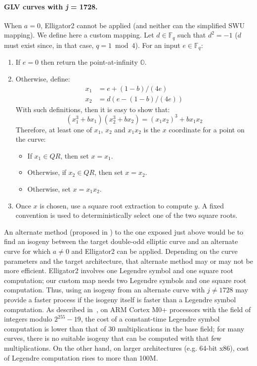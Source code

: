 \documentclass{llncs}
\newcommand{\bF}{\mathbb{F}}
\newcommand{\neutral}{\mathbb{O}}
\begin{document}
\paragraph{GLV curves with \emph{j} = 1728.} When $a = 0$, Elligator2
cannot be applied (and neither can the simplified SWU mapping). We
define here a custom mapping. Let $d \in \bF_q$ such that $d^2 = -1$
($d$ must exist since, in that case, $q = 1\bmod 4$). For an input
$e \in \bF_q$:
\begin{enumerate}

    \item If $e = 0$ then return the point-at-infinity $\neutral$.

    \item Otherwise, define:
    \begin{align*}
        x_1 &= e + (1 - b)/(4e) \\
        x_2 &= d(e - (1 - b)/(4e))
    \end{align*}
    With such definitions, then it is easy to show that:
    \begin{equation*}
        (x_1^3 + bx_1)(x_2^3 + bx_2) = (x_1 x_2)^3 + b x_1 x_2
    \end{equation*}
    Therefore, at least one of $x_1$, $x_2$ and $x_1 x_2$ is the $x$
    coordinate for a point on the curve:
    \begin{itemize}
        \item If $x_1 \in QR$, then set $x = x_1$.
        \item Otherwise, if $x_2 \in QR$, then set $x = x_2$.
        \item Otherwise, set $x = x_1 x_2$.
    \end{itemize}

    \item Once $x$ is chosen, use a square root extraction to compute $y$.
    A fixed convention is used to deterministically select one of the
    two square roots.

\end{enumerate}

An alternate method (proposed in \cite{WahBon2019}) to the one exposed
just above would be to find an isogeny between the target double-odd
elliptic curve and an alternate curve for which $a \neq 0$ and
Elligator2 can be applied. Depending on the curve parameters and the
target architecture, that alternate method may or may not be more
efficient. Elligator2 involves one Legendre symbol and one square root
computation; our custom map needs two Legendre symbols and one square
root computation. Thus, using an isogeny from an alternate curve with $j
\neq 1728$ may provide a faster process if the isogeny itself is faster
than a Legendre symbol computation. As described in~\cite{Por2020-4}, on
ARM Cortex M0+ processors with the field of integers modulo
$2^{255}-19$, the cost of a constant-time Legendre symbol computation is
lower than that of 30 multiplications in the base field; for many
curves, there is no suitable isogeny that can be computed with that few
multiplications. On the other hand, on larger architectures (e.g. 64-bit
x86), cost of Legendre computation rises to more than 100M.
\end{document}
